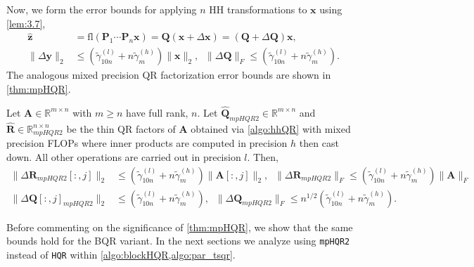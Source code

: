 \documentclass[review,onefignum,onetabnum]{siamart190516}
\newcommand{\R}{\mathbb{R}}
\newcommand{\bb}[1]{\mathbf{#1}}
\newcommand{\fl}{\mathrm{fl}}
\newcommand{\cO}{\mathcal{O}}
\begin{document}
Now, we form the error bounds for applying $n$ HH transformations to $\bb{x}$ using \cref{lem:3.7},
\begin{align}
\hat{\bb{z}} &= \fl(\bb{P}_1\cdots\bb{P}_n\bb{x})=\bb{Q} (\bb{x} +\Delta \bb{x}) = (\bb{Q} + \Delta \bb{Q})\bb{x},\\
\|\Delta \bb{y}\|_2 &\leq (\tilde{\gamma}_{10n}^{(l)}+n\tilde{\gamma}_m^{(h)})\|\bb{x}\|_2,\;\; \|\Delta \bb{Q}\|_F\leq (\tilde{\gamma}_{10n}^{(l)}+n\tilde{\gamma}_m^{(h)}).\label{eqn:mp19.3}
\end{align} 
The analogous mixed precision QR factorization error bounds are shown in \cref{thm:mpHQR}.
\begin{theorem}
	\label{thm:mpHQR}
	Let $\bb{A}\in\R^{m\times n}$ with $m\geq n$ have full rank, $n$. 
	Let $\hat{\bb{Q}}_{mpHQR2}\in\R^{m\times n}$ and $\hat{\bb{R}}\in\R^{n\times n}_{mpHQR2}$ be the thin QR factors of $\bb{A}$ obtained via \cref{algo:hhQR} with mixed precision FLOPs where inner products are computed in precision $h$ then cast down.
	All other operations are carried out in precision $l$.
	Then,
	\begin{align}
	\|\Delta \bb{R}_{mpHQR2}[:,j]\|_2&\leq (\tilde{\gamma}_{10n}^{(l)}+n\tilde{\gamma}_m^{(h)}) \|\bb{A}[:,j]\|_2,\;\; \|\Delta \bb{R}_{mpHQR2}\|_F\leq (\tilde{\gamma}_{10n}^{(l)}+n\tilde{\gamma}_m^{(h)}) \|\bb{A}\|_F \label{eqn:mpHQR2R}\\
	\|\Delta \bb{Q}[:,j]_{mpHQR2}\|_2&\leq (\tilde{\gamma}_{10n}^{(l)}+n\tilde{\gamma}_m^{(h)}),\;\; \|\Delta \bb{Q}_{mpHQR2}\|_F \leq n^{1/2} (\tilde{\gamma}_{10n}^{(l)}+n\tilde{\gamma}_m^{(h)})\label{eqn:mpHQR2Q}.
	\end{align}
\end{theorem}

Before commenting on the significance of \cref{thm:mpHQR}, we show that the same bounds hold for the BQR variant.
In the next sections we analyze using {\tt mpHQR2} instead of {\tt HQR} within \cref{algo:blockHQR,algo:par_tsqr}.
\end{document}
